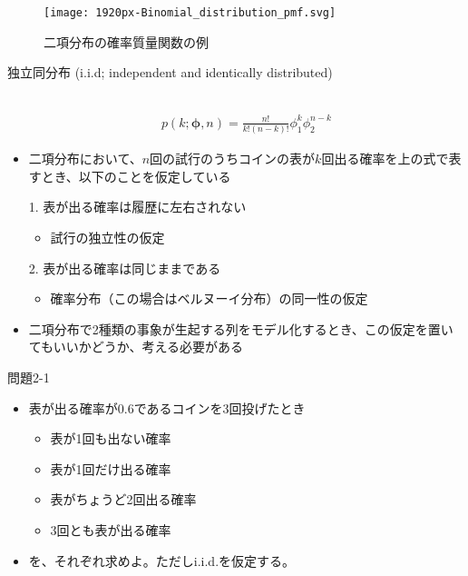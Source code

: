 \documentclass[aspectratio=169,unicode,dvipdfmx,14pt]{beamer}
\begin{document}
\begin{frame}
\begin{figure}[htbp]
\begin{center}
\vspace{.2in}
\texttt{[image: 1920px-Binomial\_distribution\_pmf.svg]}
\caption{二項分布の確率質量関数の例}
\label{}
\end{center}
\end{figure}
\end{frame}


\begin{frame}{独立同分布 {\normalsize (i.i.d; independent and identically distributed)}}
\begin{itemize}
\item[] \
\vspace{-.3in}
\begin{align}
p(k;\bm{\phi},n)=\frac{n!}{k!(n-k)!}\phi_1^k\phi_2^{n-k}
\end{align}
\item 二項分布において、$n$回の試行のうちコインの表が$k$回出る確率を上の式で表すとき、以下のことを仮定している
\item[1.] 表が出る確率は履歴に左右されない
\begin{itemize}
\item 試行の独立性の仮定
\end{itemize}
\item[2.] 表が出る確率は同じままである
\begin{itemize}
\item 確率分布（この場合はベルヌーイ分布）の同一性の仮定
\end{itemize}
\item 二項分布で2種類の事象が生起する列をモデル化するとき、この仮定を置いてもいいかどうか、考える必要がある
\end{itemize}
\end{frame}

\begin{frame}{問題2-1}
\begin{itemize}
\item 表が出る確率が0.6であるコインを3回投げたとき
\begin{itemize}
\item 表が1回も出ない確率
\item 表が1回だけ出る確率
\item 表がちょうど2回出る確率
\item 3回とも表が出る確率
\end{itemize}
\item を、それぞれ求めよ。ただしi.i.d.を仮定する。
\end{itemize}
\end{frame}
\end{document}
